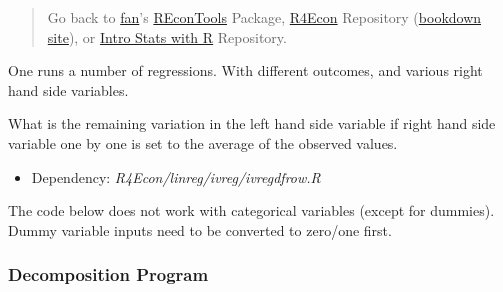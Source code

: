 \documentclass[
]{book}
\providecommand{\tightlist}{%
  \setlength{\itemsep}{0pt}\setlength{\parskip}{0pt}}
\begin{document}
\begin{quote}
Go back to \href{http://fanwangecon.github.io/CodeDynaAsset/}{fan}'s \href{https://fanwangecon.github.io/REconTools/}{REconTools} Package, \href{https://fanwangecon.github.io/R4Econ/}{R4Econ} Repository (\href{https://fanwangecon.github.io/R4Econ/bookdown}{bookdown site}), or \href{https://fanwangecon.github.io/Stat4Econ/}{Intro Stats with R} Repository.
\end{quote}

One runs a number of regressions. With different outcomes, and various right hand side variables.

What is the remaining variation in the left hand side variable if right hand side variable one by one is set to the average of the observed values.

\begin{itemize}
\tightlist
\item
  Dependency: \emph{R4Econ/linreg/ivreg/ivregdfrow.R}
\end{itemize}

The code below does not work with categorical variables (except for dummies). Dummy variable inputs need to be converted to zero/one first.

\hypertarget{decomposition-program}{%
\subsubsection{Decomposition Program}\label{decomposition-program}}
\end{document}
